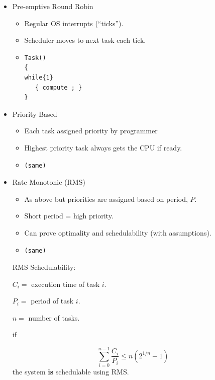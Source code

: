 \documentclass{article}	%
\begin{document}
\begin{itemize}	%

        \item	%
Pre-emptive Round Robin
        \begin{itemize}
                \item Regular OS interrupts (``ticks'').
                \item Scheduler moves to next task each tick.
                \item \begin{verbatim}
Task()
{
while{1}
   { compute ; }
}
\end{verbatim}
        \end{itemize}


     \item	%
Priority Based
        \begin{itemize}
                \item Each task assigned priority by programmer
                \item Highest priority task always gets the CPU if
ready.                \item \begin{verbatim}
(same)
\end{verbatim}
        \end{itemize}



        \item	%
 Rate Monotonic (RMS)
        \begin{itemize}
                \item As above but priorities are assigned based on
                period, $P$.
                \item Short period = high priority.
                \item Can prove optimality and schedulability (with
assumptions).      
                \item \begin{verbatim}
(same)
\end{verbatim}
        \end{itemize}


RMS Schedulability:

$C_i = $ execution time of task $i$.

$P_i = $ period of task $i$.

$n = $ number of tasks.

if 

\[
\sum^{n-1}_{i=0}\frac{C_i}{P_i} \leq n(2^{1/n}-1)
\]
the system {\bf is} schedulable using RMS.


\end{itemize}
\end{document}
